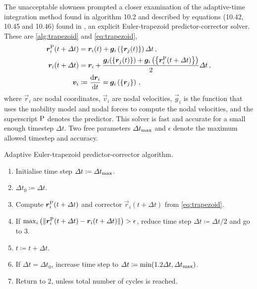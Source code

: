 The unacceptable slowness prompted a closer examination of the adaptive-time integration method found in algorithm 10.2 and described by equations (10.42, 10.45 and 10.46) found in \cite[p.~214--216]{ddlab}, an explicit Euler-trapezoid predictor-corrector solver. These are \cref{alg:trapezoid} and \cref{eq:trapezoid},
\begin{align}\label{eq:trapezoid}
    \vec{r}_i^{\rvar{P}}(t + \Delta t) & = \vec{r}_i(t) + \vec{g}_i\left(\left\{ \vec{r}_j(t) \right\}\right) \Delta t\,,                                                                     \\
    \vec{r}_i(t + \Delta t)            & = \vec{r}_i + \dfrac{\vec{g}_i(\left\{\vec{r}_j(t)\right\}) + \vec{g}_i\left(\left\{\vec{r}_i^{\rvar{P}}(t + \Delta t)\right\}\right)}{2}\Delta t\,, \\
    \vec{v}_i                          & \coloneqq \dfrac{\rvar{d}\vec{r}_i}{\rvar{d}t} = \vec{g}_i\left(\left\{\vec{r}_j\right\}\right)\,,
\end{align}
where $\vec{r}_i$ are nodal coordinates, $\vec{v}_i$ are nodal velocities, $\vec{g}_i$ is the function that uses the mobility model and nodal forces to compute the nodal velocities, and the superscript $\textrm{P}$ denotes the predictor. This solver is fast and accurate for a small enough timestep $\Delta t$. Two free parameters $\Delta t_{\textrm{max}}$ and $\epsilon$ denote the maximum allowed timestep and accuracy.
\begin{algorithm}
    \caption{Adaptive Euler-trapezoid predictor-corrector algorithm.}
    \label{alg:trapezoid}
    \begin{enumerate}
        \item Initialise time step $\Delta t \coloneqq \Delta t_{\textrm{max}}$.
        \item $\Delta t_0 \coloneqq \Delta t$.
        \item Compute $\vec{r}_i^{\rvar{P}}(t + \Delta t)$ and corrector $\vec{r}_i(t + \Delta t)$ from \cref{eq:trapezoid}.
        \item If $\max_i\left(\lVert \vec{r}_i^{\rvar{P}}(t + \Delta t) - \vec{r}_i(t + \Delta t)\rVert\right) > \epsilon$, reduce time step $\Delta t \coloneqq \Delta t / 2$ and go to 3.
        \item $t \coloneqq t + \Delta t$.
        \item If $\Delta t = \Delta t_0$, increase time step to $\Delta t \coloneqq \min(1.2 \Delta t, \Delta t_{\textrm{max}})$.
        \item Return to 2, unless total number of cycles is reached.
    \end{enumerate}
\end{algorithm}

